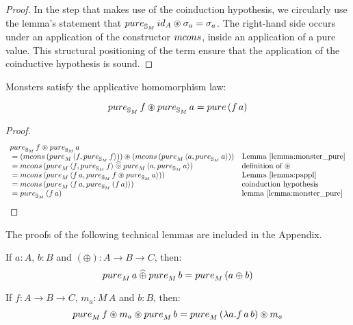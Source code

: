 \begin{proof}
In the step that makes use of the coinduction hypothesis, we circularly use the lemma's statement that $\apure_{\stream{M}}\,\id_A \appl \sigma_a = \sigma_a$.
The right-hand side occurs under an application of the constructor $\mcons$, inside an application of a pure value. 
This structural positioning of the term ensure that the application of the coinductive hypothesis is sound.
\end{proof}

\begin{lemma}
Monsters satisfy the applicative homomorphism law:

$$
\apure_{\stream{M}}\,f \appl \apure_{\stream{M}}\,a = \apure\,(f\,a)
$$

\end{lemma}
\begin{proof}

$$
\begin{array}{ll}
\apure_{\stream{M}}\,f \appl \apure_{\stream{M}}\,a\\
{}= (\mcons\,(\apure_M\,\langle f, \apure_{\stream{M}}\,f\rangle)) \appl
    (\mcons\,(\apure_M\,\langle a, \apure_{\stream{M}}\,a\rangle))
  & \mbox{Lemma \ref{lemma:monster_pure}}\\
{}= \mcons\,(\apure_M\,\langle f, \apure_{\stream{M}}\,f\rangle \alift{\pappl}
             \apure_M\,\langle a, \apure_{\stream{M}}\,a\rangle)
  & \mbox{definition of }\appl\\
{}= \mcons\,(\apure_M\,\langle f\, a, \apure_{\stream{M}}\,f \appl \apure_{\stream{M}}\,a \rangle))
  & \mbox{Lemma }\ref{lemma:pappl}\\
{}= \mcons\,(\apure_M\,\langle f\,a, \apure_{\stream{M}}\,(f\,a)\rangle)
  & \mbox{coinduction hypothesis}\\
{}= \apure_{\stream{M}}\,(f\,a)
  & \mbox{lemma }\ref{lemma:monster_pure}
\end{array}
$$
\end{proof}


The proofs of the following technical lemmas are included in the Appendix.

\begin{lemma}\label{lemma:pure_lift}
If $a:A$, $b:B$ and $(\oplus) : A \rightarrow B \rightarrow C$, then:
$$
\apure_M\, a \alift{\oplus} \apure_M\, b = \apure_M\, (a \oplus b)
$$
\end{lemma} 

\begin{lemma}\label{lemma:applicative_flip}
If $f : A \rightarrow B \rightarrow C$, $m_a : M\, A$ and $b : B$, then:
$$
\apure_M\, f \appl m_a \appl \apure_M\, b = \apure_M\, (\lambda a . f\, a\, b) \appl m_a
$$
\end{lemma}

